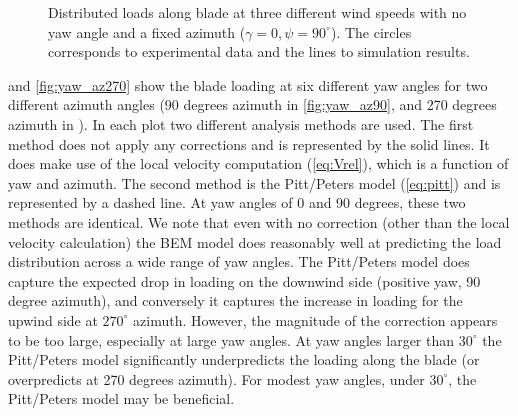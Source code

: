 \documentclass[]{aiaa-tc}%
\begin{document}
\begin{figure}[htbp]
\centering
 \quad
 \quad
 \caption{Distributed loads along blade at three different wind speeds with no yaw angle and a fixed azimuth ($\gamma = 0, \psi = 90^\circ$).  The circles corresponds to experimental data and the lines to simulation results.}
 \label{fig:Uinf}
\end{figure}


 and \cref{fig:yaw_az270} show the blade loading at six different yaw angles for two different azimuth angles (90 degrees azimuth in \cref{fig:yaw_az90}, and 270 degrees azimuth in ).  In each plot two different analysis methods are used.  The first method does not apply any corrections and is represented by the solid lines.  It does make use of the local velocity computation (\cref{eq:Vrel}), which is a function of yaw and azimuth.  The second method is the Pitt/Peters model (\cref{eq:pitt}) and is represented by a dashed line.  At yaw angles of 0 and 90 degrees, these two methods are identical.  We note that even with no correction (other than the local velocity calculation) the BEM model does reasonably well at predicting the load distribution across a wide range of yaw angles.  The Pitt/Peters model does capture the expected drop in loading on the downwind side (positive yaw, 90 degree azimuth), and conversely it captures the increase in loading for the upwind side at $270^\circ$ azimuth.  However, the magnitude of the correction appears to be too large, especially at large yaw angles.  At yaw angles larger than $30^\circ$ the Pitt/Peters model significantly underpredicts the loading along the blade (or overpredicts at 270 degrees azimuth).  For modest yaw angles, under $30^\circ$, the Pitt/Peters model may be beneficial.   
\end{document}
